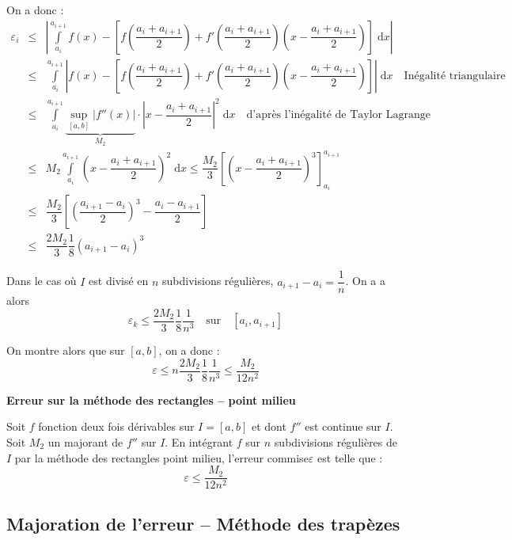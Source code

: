 \documentclass[10pt]{article}
\begin{document}
  On a donc :  
\begin{eqnarray*}
\varepsilon_i & \leq &\left|
\int\limits_{a_i}^{a_{i+1}} f(x) - \left[
f\left(\dfrac{a_i+a_{i+1}}{2} \right)
+f'\left(\dfrac{a_i+a_{i+1}}{2} \right)\left(x - \dfrac{a_i+a_{i+1}}{2}\right)
\right] \; \mathrm{d}x\right| \\
& \leq & \int\limits_{a_i}^{a_{i+1}} \left|f(x) - \left[
f\left(\dfrac{a_i+a_{i+1}}{2} \right)
+f'\left(\dfrac{a_i+a_{i+1}}{2} \right)\left(x - \dfrac{a_i+a_{i+1}}{2}\right)
\right] \right|\; \mathrm{d}x \quad \text{Inégalité triangulaire}\\
& \leq & \int\limits_{a_i}^{a_{i+1}} \underbrace{\underset{[a,b]}{\sup} \left| f''(x)\right|}_{M_2} \cdot \left| x- \dfrac{a_i+a_{i+1}}{2}\right|^2  \; \mathrm{d}x \quad \text{d'après l'inégalité de Taylor Lagrange}\\
& \leq & M_2 \int\limits_{a_i}^{a_{i+1}} \left( x- \dfrac{a_i+a_{i+1}}{2}\right)^2  \; \mathrm{d}x \leq \dfrac{M_2}{3} \left[ \left( x- \dfrac{a_i+a_{i+1}}{2}\right)^3\right]_{a_i}^{a_{i+1}} \\
& \leq & \dfrac{M_2}{3} \left[ \left( \dfrac{a_{i+1}-a_{i}}{2} \right)^3- \dfrac{a_i-a_{i+1}}{2}\right]\\
& \leq & \dfrac{2M_2}{3}\dfrac{1}{8}\left( {a_{i+1}-a_{i}}\right)^3
\end{eqnarray*}


Dans le cas où $I$ est divisé en $n$ subdivisions régulières, $a_{i+1}-a_i = \dfrac{1}{n}$. On a a alors 
$$
\varepsilon_k \leq \dfrac{2M_2}{3}\dfrac{1}{8}\dfrac{1}{n^3} \quad \text{sur}\quad [a_i,a_{i+1}]
$$

On montre alors que sur $[a,b]$, on a donc :
$$
\varepsilon \leq n \dfrac{2M_2}{3}\dfrac{1}{8}\dfrac{1}{n^3} \leq \dfrac{M_2}{12 n^2}
$$


\begin{resultat}
\textbf{Erreur sur la méthode des rectangles -- point milieu}

Soit $f$ fonction deux fois dérivables sur $I=[a,b]$ et dont $f''$ est continue sur $I$. Soit $M_2$ un majorant de $f''$ sur $I$. En intégrant $f$ sur $n$ subdivisions régulières de $I$ par la méthode des rectangles point milieu, l'erreur commise$\varepsilon$ est telle que : 
$$ \varepsilon \leq \dfrac{M_2}{12n^2}$$ 

\end{resultat}

\subsection{Majoration de l'erreur -- Méthode des trapèzes}
\end{document}
